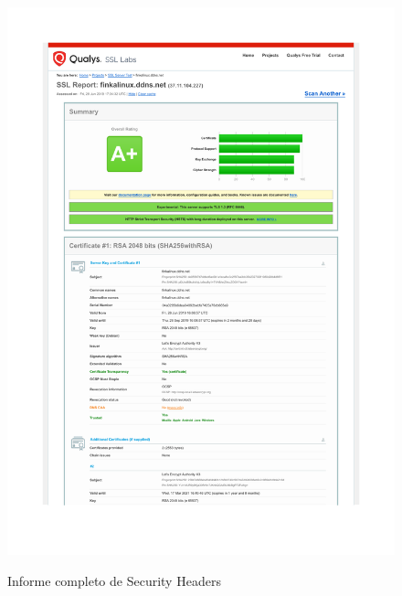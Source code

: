 \begin{appendices}
\begin{figure}
  \includegraphics[width=\textwidth]{Material_Adicional/InformeQualys}
  \label{tabla:informequalys}
  \caption{Informe completo de Security Headers}
\end{figure}

\end{appendices}
